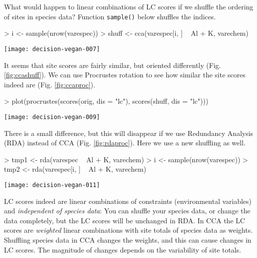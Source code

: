 \documentclass[a4paper,10pt]{amsart}
\begin{document}
What would happen to linear combinations of LC scores if we shuffle
the ordering of sites in species data?  Function \texttt{sample()} below
shuffles the indices.
\begin{Schunk}
\begin{Sinput}
> i <- sample(nrow(varespec))
> shuff <- cca(varespec[i, ] ~ Al + K, varechem)
\end{Sinput}
\end{Schunk}
\begin{SCfigure}
\texttt{[image: decision-vegan-007]}
\caption{LC scores of shuffled species data.}
\label{fig:ccashuff}
\end{SCfigure}
It seems that site scores are fairly similar, but oriented differently
(Fig. \ref{fig:ccashuff}).  We can use Procrustes rotation to see how
similar the site scores indeed are (Fig. \ref{fig:ccaproc}).
\begin{Schunk}
\begin{Sinput}
> plot(procrustes(scores(orig, dis = "lc"), scores(shuff, dis = "lc")))
\end{Sinput}
\end{Schunk}
\begin{SCfigure}
\texttt{[image: decision-vegan-009]}
\caption{Procrustes rotation of LC scores from CCA of original and shuffled data.}
\label{fig:ccaproc}
\end{SCfigure}
There is a small difference, but this will disappear if we use
Redundancy Analysis (RDA) instead of CCA
(Fig. \ref{fig:rdaproc}). Here we use a new shuffling as well.
\begin{Schunk}
\begin{Sinput}
> tmp1 <- rda(varespec ~ Al + K, varechem)
> i <- sample(nrow(varespec))
> tmp2 <- rda(varespec[i, ] ~ Al + K, varechem)
\end{Sinput}
\end{Schunk}
\begin{SCfigure}
\texttt{[image: decision-vegan-011]}
\caption{Procrustes rotation of LC scores in RDA of the original and shuffled data.}
\label{fig:rdaproc}
\end{SCfigure}

LC scores indeed are linear combinations of constraints (environmental
variables) and \emph{independent of species data}: You can
shuffle your species data, or change the data completely, but the LC
scores will be unchanged in RDA.  In CCA the LC scores are
\emph{weighted} linear combinations with site totals of species data
as weights. Shuffling species data in CCA changes the weights, and
this can cause changes in LC scores.  The magnitude of changes depends
on the variability of site totals.
\end{document}
